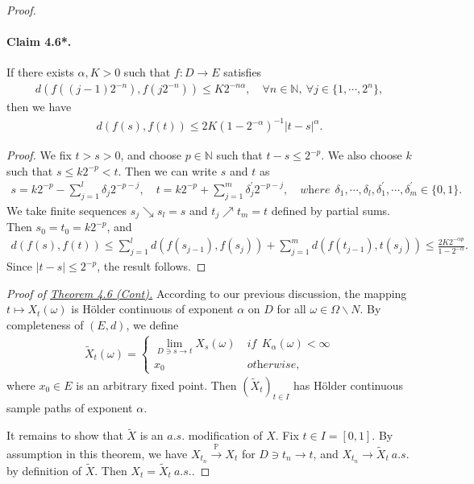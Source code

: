 \documentclass{article}
\numberwithin{equation}{section}
\renewcommand{\P}{\mathbb{P}}
\theoremstyle{plain}
\theoremstyle{definition}
\begin{document}
\begin{proof}
\paragraph{Claim 4.6*.\label{claim:4.6*}} If there exists $\alpha,K>0$ such that $f:D\to E$ satisfies
\begin{align*}
	d\left(f((j-1)2^{-n}),f(j2^{-n})\right)\leq K2^{-n\alpha},\quad \forall n\in\mathbb{N},\ \forall j\in\{1,\cdots,2^n\},
\end{align*}
then we have
\begin{align*}
	d\left(f(s),f(t)\right)\leq2K\left(1-2^{-\alpha}\right)^{-1}\vert t-s\vert^\alpha.
\end{align*}
\begin{proof}
We fix $t>s>0$, and choose $p\in\mathbb{N}$ such that $t-s\leq 2^{-p}$. We also choose $k$ such that $s\leq k2^{-p} < t$. Then we can write $s$ and $t$ as
\begin{align*}
	s=k2^{-p}-\sum_{j=1}^l \delta_j 2^{-p-j},\quad t=k2^{-p}+\sum_{j=1}^m \delta_j^\prime 2^{-p-j},\quad \textit{where}\ \ \delta_1,\cdots,\delta_l,\delta_1^\prime,\cdots,\delta_m^\prime\in\{0,1\}.
\end{align*}
We take finite sequences $s_j\searrow s_l=s$ and $t_j\nearrow t_m=t$ defined by partial sums. Then $s_0=t_0=k2^{-p}$, and
\begin{align*}
	d\left(f(s),f(t)\right)\leq \sum_{j=1}^l d\left(f(s_{j-1}),f(s_j)\right)+\sum_{j=1}^m d\left(f(t_{j-1}),t(s_j)\right) \leq \frac{2K2^{-\alpha p}}{1-2^{-\alpha}}.
\end{align*}
Since $\vert t-s\vert\leq 2^{-p}$, the result follows.
\end{proof}

\textit{Proof of \hyperref[thm:4.6]{Theorem 4.6 (Cont).}} According to our previous discussion, the mapping $t\mapsto X_t(\omega)$ is Hölder continuous of exponent $\alpha$ on $D$ for all $\omega\in\Omega\backslash N$. By completeness of $(E,d)$, we define
\begin{align*}
\widetilde{X}_t(\omega)=\begin{cases}
\lim_{D\ni s\to t}X_s(\omega)\ &\textit{if}\ \ K_\alpha(\omega)<\infty\\
x_0\ &\textit{otherwise},
\end{cases}
\end{align*}
where $x_0\in E$ is an arbitrary fixed point. Then $(\widetilde{X}_t)_{t\in I}$ has Hölder continuous sample paths of exponent $\alpha$.

It remains to show that $\widetilde{X}$ is an $a.s.$ modification of $X$. Fix $t\in I=[0,1]$. By assumption in this theorem, we have $X_{t_n}\overset{\P}{\to}X_t$ for $D\ni t_n\to t$, and $X_{t_n}\to\widetilde{X}_t\ a.s.$ by definition of $\widetilde{X}$. Then $X_t=\widetilde{X}_t\ a.s.$.
\end{proof}
\end{document}
